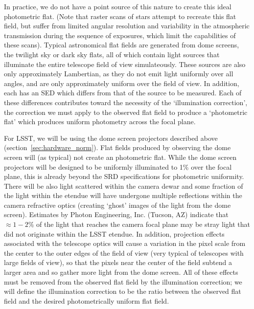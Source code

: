 \documentclass[12pt,preprint]{aastex}
\begin{document}
In practice, we do not have a point source of this nature to create
this ideal photometric flat.  (Note that raster scans of stars attempt
to recreate this flat field, but suffer from limited angular
resolution and variability in the atmospheric transmission during the
sequence of exposures, which limit the capabilities of these
scans). Typical astronomical flat fields are generated from dome
screens, the twilight sky or dark sky flats, all of which contain
light sources that illuminate the entire telescope field of view
simulateously. These sources are also only approximately Lambertian,
as they do not emit light uniformly over all angles, and are only
approximately uniform over the field of view. In addition, each has an
SED which differs from that of the source to be measured. Each of
these differences contributes toward the necessity of the
`illumination correction', the correction we must apply to the
observed flat field to produce a `photometric flat' which produces
uniform photometry across the focal plane.

For LSST, we will be using the dome screen projectors described above
(section~\ref{sec:hardware_norm}). Flat fields produced by observing
the dome screen will (as typical) not create an photometric
flat. While the dome screen projectors will be designed to be
uniformly illuminated to 1\% over the focal plane, this is already
beyond the SRD specifications for photometric uniformity.  There will
be also light scattered within the camera dewar and some fraction of
the light within the etendue will have undergone multiple reflections
within the camera refractive optics (creating `ghost' images of the
light from the dome screen). Estimates by Photon Engineering,
Inc. (Tucson, AZ) indicate that $\approx1-2\%$ of the light that
reaches the camera focal plane may be stray light that did not
originate within the LSST etendue. In addition, projection effects
associated with the telescope optics will cause a variation in the
pixel scale from the center to the outer edges of the field of view
(very typical of telescopes with large fields of view), so that the
pixels near the center of the field subtend a larger area and so
gather more light from the dome screen. All of these effects must be
removed from the observed flat field by the illumination correction;
we will define the illumination correction to be the ratio between the
observed flat field and the desired photometrically uniform flat
field. 

\label{sec:ghosting}
\end{document}
